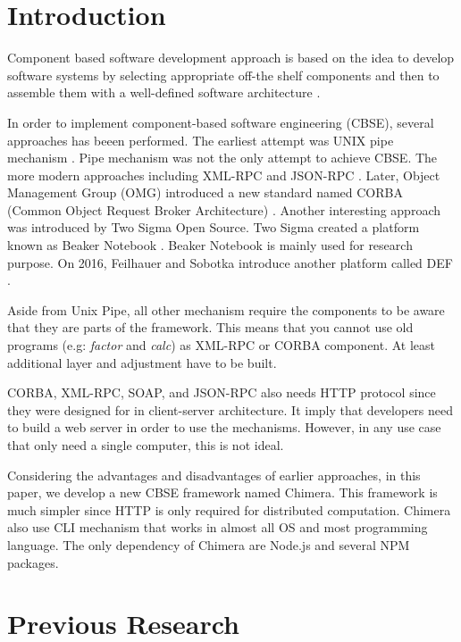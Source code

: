 \documentclass[conference]{IEEEtran}
\begin{document}
\IEEEpeerreviewmaketitle

\section{Introduction}

Component based software development approach is based on the idea to develop 
software systems by selecting appropriate off-the shelf components and then to 
assemble them with a well-defined software architecture \cite{kaur2010component}.

In order to implement component-based software engineering (CBSE), several 
approaches has beeen performed. The earliest attempt was UNIX pipe mechanism 
\cite{mcilroy1968mass}. Pipe mechanism was not the only attempt to achieve CBSE.
The more modern approaches including XML-RPC \cite{xmlrpc} and JSON-RPC \cite{jsonrpc}. 
Later, Object Management Group (OMG) introduced a new standard named CORBA (Common
Object Request Broker Architecture) \cite{corba}. Another interesting approach was 
introduced by Two Sigma Open Source. Two Sigma created a platform known as Beaker
Notebook \cite{beakernotebook}. Beaker Notebook is mainly used for research purpose. 
On 2016, Feilhauer and Sobotka introduce another platform called DEF 
\cite{feilhauer2016def}.

Aside from Unix Pipe, all other mechanism require the components to be aware that 
they are parts of the framework. This means that you cannot use old programs (e.g:
{\it factor} and {\it calc}) as XML-RPC or CORBA component. At least additional layer
and adjustment have to be built.

CORBA, XML-RPC, SOAP, and JSON-RPC also needs HTTP protocol since they were designed for 
in client-server architecture. It imply that developers need to build a web server in 
order to use the mechanisms. However, in any use case that only need a single computer,
this is not ideal.

Considering the advantages and disadvantages of earlier approaches, in this paper, 
we develop a new CBSE framework named Chimera. This framework is much simpler since
HTTP is only required for distributed computation. Chimera also use CLI mechanism that
works in almost all OS and most programming language.
The only dependency of Chimera are Node.js and several NPM packages.

\section{Previous Research}
\end{document}
